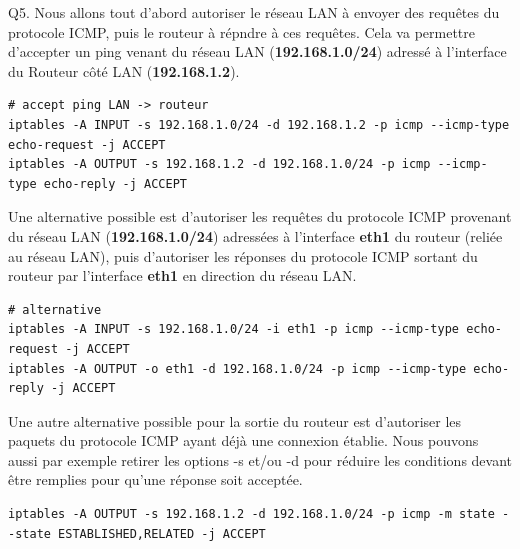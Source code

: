 \documentclass[frenchb, 11pt]{article}
\newlength{\leftbarwidth}
\newlength{\leftbarsep}
\newcommand*{\leftbarcolorcmd}{\color{leftbarcolor}} %
\renewenvironment{leftbar}{%
    \def\FrameCommand{{\leftbarcolorcmd{\vrule width \leftbarwidth\relax\hspace {\leftbarsep}}}}%
    \MakeFramed {\advance \hsize -\width \FrameRestore }%
}{%
    \endMakeFramed
}
\begin{document}
\begin{leftbar}
	\noindent Q5. Nous allons tout d'abord autoriser le réseau LAN à envoyer des requêtes du protocole ICMP, puis le routeur à répndre à ces requêtes. Cela va permettre d'accepter un ping venant du réseau LAN (\textbf{192.168.1.0/24}) adressé à l'interface du Routeur côté LAN (\textbf{192.168.1.2}).
	\begin{lstlisting}[numbers=none]
# accept ping LAN -> routeur
iptables -A INPUT -s 192.168.1.0/24 -d 192.168.1.2 -p icmp --icmp-type echo-request -j ACCEPT
iptables -A OUTPUT -s 192.168.1.2 -d 192.168.1.0/24 -p icmp --icmp-type echo-reply -j ACCEPT
	\end{lstlisting}
	\hfill
	
	\noindent Une alternative possible est d'autoriser les requêtes du protocole ICMP provenant du réseau LAN (\textbf{192.168.1.0/24}) adressées à l'interface \textbf{eth1} du routeur (reliée au réseau LAN), puis d'autoriser les réponses du protocole ICMP sortant du routeur par l'interface \textbf{eth1} en direction du réseau LAN.
	\begin{lstlisting}[numbers=none]
# alternative
iptables -A INPUT -s 192.168.1.0/24 -i eth1 -p icmp --icmp-type echo-request -j ACCEPT
iptables -A OUTPUT -o eth1 -d 192.168.1.0/24 -p icmp --icmp-type echo-reply -j ACCEPT
	\end{lstlisting}
	\hfill
	
	\noindent Une autre alternative possible pour la sortie du routeur est d'autoriser les paquets du protocole ICMP ayant déjà une connexion établie. Nous pouvons aussi par exemple retirer les options -s et/ou -d pour réduire les conditions devant être remplies pour qu'une réponse soit acceptée.
	\begin{lstlisting}[numbers=none]
iptables -A OUTPUT -s 192.168.1.2 -d 192.168.1.0/24 -p icmp -m state --state ESTABLISHED,RELATED -j ACCEPT
	\end{lstlisting}
\end{leftbar}


\newpage

\begin{thebibliography}{5}
\end{thebibliography}
\end{document}
